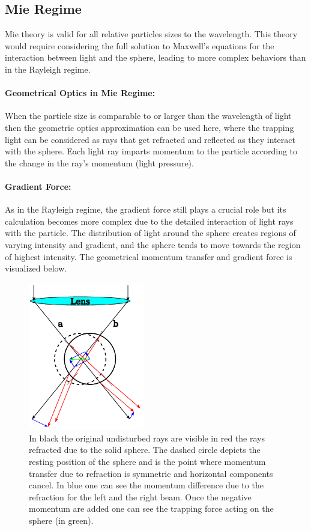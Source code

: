 \documentclass[12pt,english]{scrartcl}
\begin{document}
\subsection{Mie Regime}
Mie theory is valid for all relative particles sizes to the wavelength. This
theory would require considering the full solution to Maxwell's equations for
the interaction between light and the sphere, leading to more complex behaviors
than in the Rayleigh regime.

\paragraph{Geometrical Optics in Mie Regime:}
When the particle size is comparable to or larger than the wavelength of light
then the geometric optics approximation can be used here, where the trapping
light can be considered as rays that get refracted and reflected as they
interact with the sphere. Each light ray imparts momentum to the particle
according to the change in the ray's momentum (light pressure).

\paragraph{Gradient Force:}
As in the Rayleigh regime, the gradient force still plays a crucial role but
its calculation becomes more complex due to the detailed interaction of light
rays with the particle. The distribution of light around the sphere creates
regions of varying intensity and gradient, and the sphere tends to move towards
the region of highest intensity. The geometrical momentum transfer and gradient
force is visualized below.\cite{bustamanteOpticalTweezersSinglemolecule2021}

\begin{figure}[H]
	\centering
	\includegraphics[width=0.45\textwidth]{figures/mieworkingprinciple.pdf}
	\caption[Working principle of optical tweezers in mie regime]{In black the original
		undisturbed rays are visible in red the rays refracted due to the solid sphere.
		The dashed circle depicts the resting position of the sphere and is the point
		where momentum transfer due to refraction is symmetric and horizontal
		components cancel. In blue one can see the momentum difference due to the
		refraction for the left and the right beam. Once the negative momentum are
		added one can see the trapping force acting on the sphere (in green).
	}\label{fig:mie_working_principle}
\end{figure}
\end{document}
